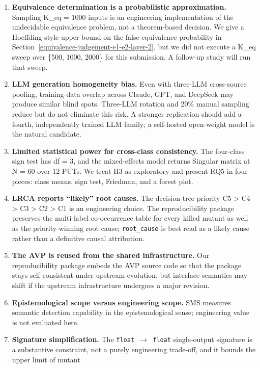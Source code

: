 \documentclass[12pt]{article}
\begin{document}
\begin{enumerate}
\item
  \textbf{Equivalence determination is a probabilistic approximation.}
  Sampling K\_eq = 1000 inputs is an engineering implementation of the
  undecidable equivalence problem, not a theorem-based decision. We give
  a Hoeffding-style upper bound on the false-equivalence probability in
  Section~\ref{equivalence-judgement-e1-e2-layer-2}, but we did not execute a K\_eq sweep over \{500, 1000, 2000\}
  for this submission. A follow-up study will run that sweep.
\item
  \textbf{LLM generation homogeneity bias.} Even with three-LLM
  cross-source pooling, training-data overlap across Claude, GPT, and
  DeepSeek may produce similar blind spots. Three-LLM rotation and 20\%
  manual sampling reduce but do not eliminate this risk. A stronger
  replication should add a fourth, independently trained LLM family; a
  self-hosted open-weight model is the natural candidate.
\item
  \textbf{Limited statistical power for cross-class consistency.} The
  four-class sign test has df = 3, and the mixed-effects model returns
  Singular matrix at N = 60 over 12 PUTs. We treat H3 as exploratory and
  present RQ5 in four pieces: class means, sign test, Friedman, and a
  forest plot.
\item
  \textbf{LRCA reports ``likely'' root causes.} The decision-tree
  priority C5 \textgreater{} C4 \textgreater{} C3 \textgreater{} C2
  \textgreater{} C1 is an engineering choice. The reproducibility
  package preserves the multi-label co-occurrence table for every killed
  mutant as well as the priority-winning root cause; \texttt{root\_cause}
  is best read as a likely cause rather than a definitive causal
  attribution.
\item
  \textbf{The AVP is reused from the shared infrastructure.} Our reproducibility package
  embeds the AVP source code so that the package stays self-consistent under upstream
  evolution, but interface semantics may shift if the upstream infrastructure undergoes a major
  revision.
\item
  \textbf{Epistemological scope versus engineering scope.} SMS measures
  semantic detection capability in the epistemological sense;
  engineering value is not evaluated here.
\item
  \textbf{Signature simplification.} The \texttt{float\ $\to$\ float}
  single-output signature is a substantive constraint, not a purely
  engineering trade-off, and it bounds the upper limit of mutant

\end{enumerate}
\end{document}
